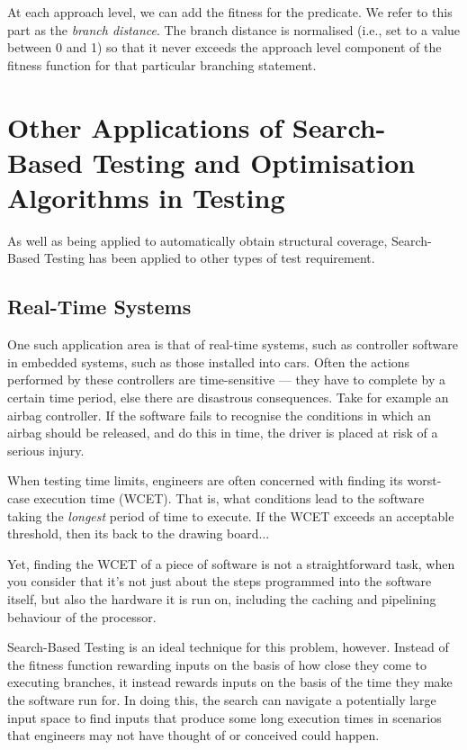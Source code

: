 
At each approach level, we can add the fitness for the predicate. We refer to
this part as the {\it branch distance}. The branch distance is normalised
(i.e., set to a value between 0 and 1) so that it never exceeds the approach
level component of the fitness function for that particular branching statement.




\section{Other Applications of Search-Based Testing and Optimisation Algorithms
in Testing}

As well as being applied to automatically obtain structural coverage,
Search-Based Testing has been applied to other types of test requirement.

\subsection{Real-Time Systems}

One such application area is that of real-time systems, such as controller
software in embedded systems, such as those installed into cars. Often the
actions performed by these controllers are time-sensitive --- they have to
complete by a certain time period, else there are disastrous consequences. Take
for example an airbag controller. If the software fails to recognise the
conditions in which an airbag should be released, and do this in time, the
driver is placed at risk of a serious injury. 

When testing time limits, engineers are often concerned with finding its
worst-case execution time (WCET). That is, what conditions lead to the software
taking the {\it longest} period of time to execute. If the WCET exceeds an
acceptable threshold, then its back to the drawing board...

Yet, finding the WCET of a piece of software is not a straightforward task, when
you consider that it's not just about the steps programmed into the software
itself, but also the hardware it is run on, including the caching and pipelining
behaviour of the processor. 

Search-Based Testing is an ideal technique for this problem, however. Instead of
the fitness function rewarding inputs on the basis of how close they come to
executing branches, it instead rewards inputs on the basis of the time they make
the software run for. In doing this, the search can navigate a potentially large
input space to find inputs that produce some long execution times in scenarios
that engineers may not have thought of or conceived could happen.


